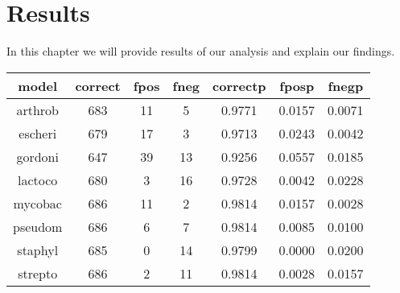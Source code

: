 \chapter{Results}
In this chapter we will provide results of our analysis and explain our findings.
\\
\begin{tabular}{| c | c | c | c | c | c | c |}
\hline
model & correct & fpos & fneg & correctp	& fposp & fnegp \\
\hline
arthrob & 683 & 11 & 5  & 0.9771 & 0.0157 & 0.0071 \\
escheri & 679 & 17 & 3  & 0.9713 & 0.0243 & 0.0042 \\
gordoni & 647 & 39 & 13 & 0.9256 & 0.0557 & 0.0185 \\
lactoco & 680 & 3  & 16 & 0.9728 & 0.0042 & 0.0228 \\
mycobac & 686 & 11 & 2  & 0.9814 & 0.0157 & 0.0028 \\
pseudom & 686 & 6  & 7  & 0.9814 & 0.0085 & 0.0100 \\
staphyl & 685 & 0  & 14 & 0.9799 & 0.0000 & 0.0200 \\
strepto & 686 & 2  & 11 & 0.9814 & 0.0028 & 0.0157 \\
\hline
\end{tabular}